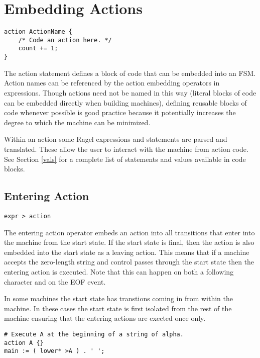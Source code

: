 \documentclass[letterpaper,11pt,oneside]{book}
\newcommand{\verbspace}{\vspace{10pt}}
\newenvironment{inline_code}{\def\baselinestretch{1}\vspace{12pt}\small}{}
\begin{document}
\section{Embedding Actions}

\begin{verbatim}
action ActionName {
    /* Code an action here. */
    count += 1;
}
\end{verbatim}
\verbspace

The action statement defines a block of code that can be embedded into an FSM.
Action names can be referenced by the action embedding operators in
expressions. Though actions need not be named in this way (literal blocks
of code can be embedded directly when building machines), defining reusable
blocks of code whenever possible is good practice because it potentially increases the
degree to which the machine can be minimized. 

Within an action some Ragel expressions and statements are parsed and
translated. These allow the user to interact with the machine from action code.
See Section \ref{vals} for a complete list of statements and values available
in code blocks. 

\subsection{Entering Action}

\verb|expr > action| 

The entering action operator embeds an action into all transitions
that enter into the machine from the start state. If the start state is final,
then the action is also embedded into the start state as a leaving action. This
means that if a machine accepts the zero-length string and control passes
through the start state then the entering action is executed. Note
that this can happen on both a following character and on the EOF event.

In some machines the start state has transtions coming in from within the
machine. In these cases the start state is first isolated from the rest of the
machine ensuring that the entering actions are exected once only.

\begin{inline_code}
\begin{verbatim}
# Execute A at the beginning of a string of alpha.
action A {}
main := ( lower* >A ) . ' ';
\end{verbatim}
\end{inline_code}
\verbspace
\end{document}
